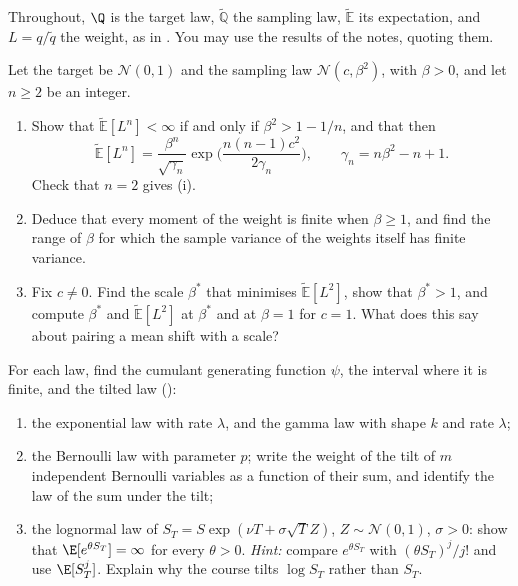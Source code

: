 \providecommand{\Qt}{\widetilde{\mathbb Q}}
\providecommand{\Et}{\widetilde{\mathbb E}}
Throughout, $\Q$ is the target law, $\Qt$ the sampling law, $\Et$ its expectation, and
$L=q/\tilde q$ the weight, as in . You may use the results of the notes,
quoting them.

\begin{exercise}\label{ex:is-moments}
\easy Let the target be $\mathcal N(0,1)$ and the sampling law $\mathcal N(c,\beta^2)$, with
$\beta>0$, and let $n\ge2$ be an integer.
\begin{enumerate}[label=(\alph*)]
  \item Show that $\Et[L^n]<\infty$ if and only if $\beta^2>1-1/n$, and that then
    \[
      \Et[L^n]=\frac{\beta^n}{\sqrt{\gamma_n}}\exp\Big(\frac{n(n-1)c^2}{2\gamma_n}\Big),\qquad
      \gamma_n=n\beta^2-n+1 .
    \]
    Check that $n=2$ gives (i).
  \item Deduce that every moment of the weight is finite when $\beta\ge1$, and find the range
    of $\beta$ for which the sample variance of the weights itself has finite variance.
  \item Fix $c\ne0$. Find the scale $\beta^*$ that minimises $\Et[L^2]$, show that $\beta^*>1$,
    and compute $\beta^*$ and $\Et[L^2]$ at $\beta^*$ and at $\beta=1$ for $c=1$. What does this
    say about pairing a mean shift with a scale?
\end{enumerate}
\end{exercise}

\begin{exercise}\label{ex:is-tilts}
\easy For each law, find the cumulant generating function $\psi$, the interval where it is
finite, and the tilted law ():
\begin{enumerate}[label=(\alph*)]
  \item the exponential law with rate $\lambda$, and the gamma law with shape $k$ and rate $\lambda$;
  \item the Bernoulli law with parameter $p$; write the weight of the tilt of $m$ independent
    Bernoulli variables as a function of their sum, and identify the law of the sum under the
    tilt;
  \item the lognormal law of $S_T=S\exp(\nu T+\sigma\sqrt T Z)$, $Z\sim\mathcal N(0,1)$, $\sigma>0$:
    show that $\E[e^{\theta S_T}]=\infty$ for every $\theta>0$. \emph{Hint:} compare $e^{\theta S_T}$
    with $(\theta S_T)^j/j!$ and use $\E[S_T^j]$. Explain why the course tilts $\log S_T$
    rather than $S_T$.
\end{enumerate}
\end{exercise}

